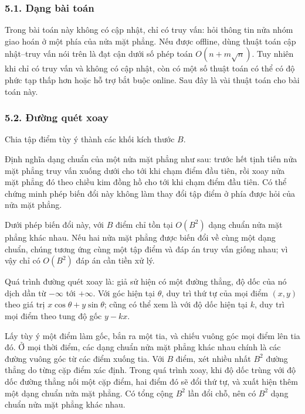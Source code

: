 \documentclass[11pt]{article}
\begin{document}
\subsubsection*{5.1. Dạng bài toán}

Trong bài toán này không có cập nhật, chỉ có truy vấn: hỏi thông tin nửa nhóm
giao hoán ở một phía của nửa mặt phẳng. Nếu được offline, dùng thuật toán
cập nhật--truy vấn nói trên là đạt cận dưới số phép toán
\(O(n+m\sqrt n)\). Tuy nhiên khi chỉ có truy vấn và không có cập nhật, còn có
một số thuật toán có thể có độ phức tạp thấp hơn hoặc hỗ trợ bắt buộc online.
Sau đây là vài thuật toán cho bài toán này.

\subsubsection*{5.2. Đường quét xoay}

Chia tập điểm tùy ý thành các khối kích thước \(B\).

Định nghĩa dạng chuẩn của một nửa mặt phẳng như sau: trước hết tịnh tiến nửa
mặt phẳng truy vấn xuống dưới cho tới khi chạm điểm đầu tiên, rồi xoay nửa mặt
phẳng đó theo chiều kim đồng hồ cho tới khi chạm điểm đầu tiên. Có thể chứng
minh phép biến đổi này không làm thay đổi tập điểm ở phía được hỏi của nửa mặt
phẳng.

Dưới phép biến đổi này, với \(B\) điểm chỉ tồn tại \(O(B^2)\) dạng chuẩn nửa
mặt phẳng khác nhau. Nếu hai nửa mặt phẳng được biến đổi về cùng một dạng
chuẩn, chúng tương ứng cùng một tập điểm và đáp án truy vấn giống nhau; vì vậy
chỉ có \(O(B^2)\) đáp án cần tiền xử lý.

Quá trình đường quét xoay là: giả sử hiện có một đường thẳng, độ dốc của nó
dịch dần từ \(-\infty\) tới \(+\infty\). Với góc hiện tại \(\theta\), duy trì
thứ tự của mọi điểm \((x,y)\) theo giá trị \(x\cos\theta+y\sin\theta\); cũng có
thể xem là với độ dốc hiện tại \(k\), duy trì mọi điểm theo tung độ gốc
\(y-kx\).

Lấy tùy ý một điểm làm gốc, bắn ra một tia, và chiếu vuông góc mọi điểm lên tia
đó. Ở mọi thời điểm, các dạng chuẩn nửa mặt phẳng khác nhau chính là các đường
vuông góc từ các điểm xuống tia. Với \(B\) điểm, xét nhiều nhất \(B^2\) đường
thẳng do từng cặp điểm xác định. Trong quá trình xoay, khi độ dốc trùng với độ
dốc đường thẳng nối một cặp điểm, hai điểm đó sẽ đổi thứ tự, và xuất hiện thêm
một dạng chuẩn nửa mặt phẳng. Có tổng cộng \(B^2\) lần đổi chỗ, nên có \(B^2\)
dạng chuẩn nửa mặt phẳng khác nhau.
\end{document}
